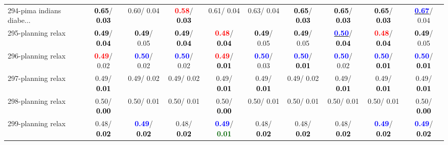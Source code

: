 \begin{table}[h]
\begin{center}
{\begin{tabular}{lc|c|c|c|c|c|c|c|c}
294-pima indians diabe... & \textcolor{black}{\textbf{  0.65}}/\textcolor{black}{\textbf{  0.03}} &   0.60/  0.04 & \textcolor{red}{\textbf{  0.58}}/\textcolor{black}{\textbf{  0.03}} &   0.61/  0.04 &   0.63/  0.04 & \textcolor{black}{\textbf{  0.65}}/\textcolor{black}{\textbf{  0.03}} & \textcolor{black}{\textbf{  0.65}}/\textcolor{black}{\textbf{  0.03}} & \textcolor{black}{\textbf{  0.65}}/\textcolor{black}{\textbf{  0.03}} & \underline{\textcolor{blue}{\textbf{  0.67}}}/  0.04 \\
295-planning relax & \textcolor{black}{\textbf{  0.49}}/\textcolor{black}{\textbf{  0.04}} & \textcolor{black}{\textbf{  0.49}}/  0.05 & \textcolor{black}{\textbf{  0.49}}/\textcolor{black}{\textbf{  0.04}} & \textcolor{red}{\textbf{  0.48}}/\textcolor{black}{\textbf{  0.04}} & \textcolor{black}{\textbf{  0.49}}/  0.05 & \textcolor{black}{\textbf{  0.49}}/  0.05 & \underline{\textcolor{blue}{\textbf{  0.50}}}/\textcolor{black}{\textbf{  0.04}} & \textcolor{red}{\textbf{  0.48}}/\textcolor{black}{\textbf{  0.04}} & \textcolor{black}{\textbf{  0.49}}/  0.05 \\ \hline
296-planning relax & \textcolor{red}{\textbf{  0.49}}/  0.02 & \textcolor{blue}{\textbf{  0.50}}/  0.02 & \textcolor{blue}{\textbf{  0.50}}/  0.02 & \textcolor{red}{\textbf{  0.49}}/\textcolor{black}{\textbf{  0.01}} & \textcolor{blue}{\textbf{  0.50}}/  0.03 & \textcolor{blue}{\textbf{  0.50}}/\textcolor{black}{\textbf{  0.01}} & \textcolor{blue}{\textbf{  0.50}}/  0.02 & \textcolor{blue}{\textbf{  0.50}}/\textcolor{black}{\textbf{  0.01}} & \textcolor{blue}{\textbf{  0.50}}/\textcolor{black}{\textbf{  0.01}} \\
297-planning relax &   0.49/\textcolor{black}{\textbf{  0.01}} &   0.49/  0.02 &   0.49/  0.02 &   0.49/\textcolor{black}{\textbf{  0.01}} &   0.49/\textcolor{black}{\textbf{  0.01}} &   0.49/  0.02 &   0.49/\textcolor{black}{\textbf{  0.01}} &   0.49/\textcolor{black}{\textbf{  0.01}} &   0.49/\textcolor{black}{\textbf{  0.01}} \\
298-planning relax &   0.50/\textcolor{black}{\textbf{  0.00}} &   0.50/  0.01 &   0.50/  0.01 &   0.50/\textcolor{black}{\textbf{  0.00}} &   0.50/  0.01 &   0.50/  0.01 &   0.50/  0.01 &   0.50/  0.01 &   0.50/\textcolor{black}{\textbf{  0.00}} \\
299-planning relax &   0.48/\textcolor{black}{\textbf{  0.02}} & \textcolor{blue}{\textbf{  0.49}}/\textcolor{black}{\textbf{  0.02}} &   0.48/\textcolor{black}{\textbf{  0.02}} & \textcolor{blue}{\textbf{  0.49}}/\textcolor{darkgreen}{\textbf{  0.01}} &   0.48/\textcolor{black}{\textbf{  0.02}} &   0.48/\textcolor{black}{\textbf{  0.02}} &   0.48/\textcolor{black}{\textbf{  0.02}} & \textcolor{blue}{\textbf{  0.49}}/\textcolor{black}{\textbf{  0.02}} & \textcolor{blue}{\textbf{  0.49}}/\textcolor{black}{\textbf{  0.02}} \\

\end{tabular}}
\end{center}
\end{table}
